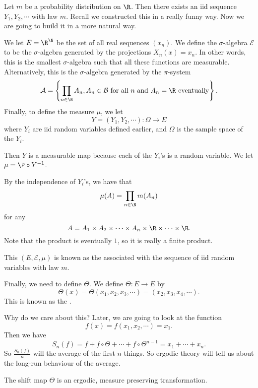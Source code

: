 \documentclass[a4paper]{article}
\begin{document}
\begin{eg}
  Let $m$ be a probability distribution on $\R$. Then there exists an iid sequence $Y_1, Y_2, \cdots$ with law $m$. Recall we constructed this in a really funny way. Now we are going to build it in a more natural way.

  We let $E = \R^\N$ be the set of all real sequences $(x_n)$. We define the $\sigma$-algebra $\mathcal{E}$ to be the $\sigma$-algebra generated by the projections $X_n(x) = x_n$. In other words, this is the smallest $\sigma$-algebra such that all these functions are measurable. Alternatively, this is the $\sigma$-algebra generated by the $\pi$-system
  \[
    \mathcal{A} = \left\{\prod_{n \in \N} A_n, A_n \in \mathcal{B}\text{ for all $n$ and $A_n = \R$ eventually}\right\}.
  \]
  Finally, to define the measure $\mu$, we let
  \[
    Y = (Y_1, Y_2, \cdots) : \Omega \to E
  \]
  where $Y_i$ are iid random variables defined earlier, and $\Omega$ is the sample space of the $Y_i$.

  Then $Y$ is a measurable map because each of the $Y_i$'s is a random variable. We let $\mu = \P \circ Y^{-1}$.

  By the independence of $Y_i$'s, we have that
  \[
    \mu(A) = \prod_{n \in \N} m(A_n)
  \]
  for any
  \[
    A = A_1 \times A_2 \times \cdots \times A_n \times \R \times \cdots \times \R.
  \]
  Note that the product is eventually $1$, so it is really a finite product.

  This $(E, \mathcal{E}, \mu)$ is known as the  associated with the sequence of iid random variables with law $m$.

  Finally, we need to define $\Theta$. We define $\Theta: E \to E$ by
  \[
    \Theta(x) = \Theta(x_1, x_2, x_3, \cdots) = (x_2, x_3, x_4, \cdots).
  \]
  This is known as the .
\end{eg}
Why do we care about this? Later, we are going to look at the function
\[
  f(x) = f(x_1, x_2, \cdots) = x_1.
\]
Then we have
\[
  S_n(f) = f + f \circ \Theta + \cdots + f \circ \Theta^{n - 1} = x_1 + \cdots + x_n.
\]
So $\frac{S_n(f)}{n}$ will the average of the first $n$ things. So ergodic theory will tell us about the long-run behaviour of the average.

\begin{thm}
  The shift map $\Theta$ is an ergodic, measure preserving transformation.
\end{thm}
\end{document}
